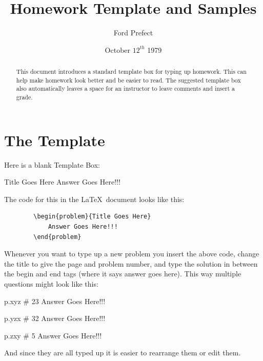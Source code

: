 \documentclass[12pt]{article}
\title{Homework Template and Samples}
\author{Ford Prefect}
\date{October \(12^{th}\) 1979}
\begin{document}
\markboth{\theauthor}{\thetitle}

\maketitle


\begin{abstract}
    This document introduces a standard template box for typing up homework.  This can help make homework look better and be easier to read. The suggested template box also automatically leaves a space for an instructor to leave comments and insert a grade.
\end{abstract}


\section{The Template}

Here is a blank Template Box:
    \begin{problem}{Title Goes Here}
        Answer Goes Here!!!
    \end{problem}

\noindent
The code for this in the \LaTeX\ document looks like this:
    \begin{verbatim}
        \begin{problem}{Title Goes Here}
            Answer Goes Here!!!
        \end{problem}
    \end{verbatim}

\noindent
Whenever you want to type up a new problem you insert the above code, change the title to give the page and problem number, and type the solution in between the begin and end tags (where it says answer goes here).  This way multiple questions might look like this:
    \begin{problem}{p.xyz \# 23}
        Answer Goes Here!!!
    \end{problem}
    \begin{problem}{p.yzx \# 32}
        Answer Goes Here!!!
    \end{problem}
    \begin{problem}{p.zxy \# 5}
        Answer Goes Here!!!
    \end{problem}

\noindent
And since they are all typed up it is easier to rearrange them or edit them.
\end{document}
